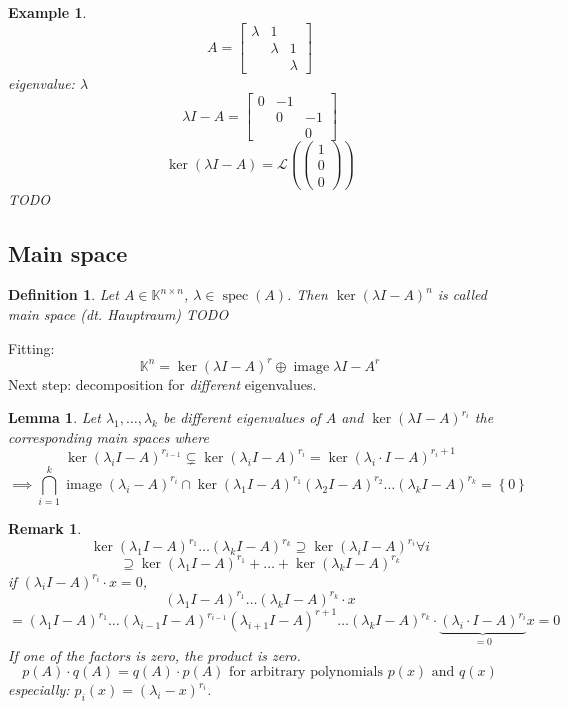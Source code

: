 \documentclass{article}
\newtheorem{example}{Example}  \numberwithin{example}{section}
\newtheorem{definition}{Definition}  \numberwithin{definition}{section}
\newtheorem{lemma}{Lemma}  \numberwithin{lemma}{section}
\newtheorem{remark}{Remark}  \numberwithin{remark}{section}
\newcommand{\set}[1]{\left\{#1\right\}}
\newcommand{\vecthree}[3]{\begin{pmatrix} #1 \\ #2 \\ #3 \end{pmatrix}}
\DeclareMathOperator{\im}{image}
\begin{document}
\begin{example}
  \[A = \begin{bmatrix} \lambda & 1 &  \\ & \lambda & 1 \\ & & \lambda \end{bmatrix} \]
  eigenvalue: $\lambda$
  \[ \lambda I - A = \begin{bmatrix} 0 & -1 & \\ & 0 & -1 \\ & & 0 \end{bmatrix} \]
  \[ \ker(\lambda I - A) = \mathcal L\left(\vecthree 100\right) \]
  TODO
\end{example}

\subsection{Main space}

\begin{definition} %
  Let $A \in \mathbb K^{n\times n}$, $\lambda \in \operatorname{spec}(A)$.
  Then $\ker(\lambda I - A)^n$ is called \emph{main space} (dt. \foreignlanguage{german}{Hauptraum})
  TODO
\end{definition}

Fitting:
\[ \mathbb K^n = \ker(\lambda I - A)^r \oplus \im{\lambda I - A}^r \]
Next step: decomposition for \emph{different} eigenvalues.

\begin{lemma} %
  \label{lemma1111}
  Let $\lambda_1, \dots, \lambda_k$ be different eigenvalues of $A$ and
  $\ker(\lambda I - A)^{r_i}$ the corresponding main spaces where
  \[ \ker(\lambda_i I - A)^{r_{i-1}} \subsetneq \ker(\lambda_i I - A)^{r_i} = \ker(\lambda_i \cdot I - A)^{r_i + 1} \]
  \[ \implies \bigcap_{i=1}^k \im(\lambda_i - A)^{r_i} \cap \ker(\lambda_1 I - A)^{r_1} (\lambda_2 I - A)^{r_2} \dots (\lambda_k I - A)^{r_k} = \set{0} \]
\end{lemma}

\begin{remark}
  \[ \ker(\lambda_1 I - A)^{r_1} \dots (\lambda_k I - A)^{r_k} \supseteq \ker(\lambda_i I - A)^{r_i} \forall i \]
  \[ \supseteq \ker(\lambda_1 I - A)^{r_1} + \dots + \ker(\lambda_k I - A)^{r_k} \]
  if $(\lambda_i I - A)^{r_i} \cdot x = 0$,
  \[ (\lambda_1 I - A)^{r_1} \dots (\lambda_k I - A)^{r_k} \cdot x \]
  \[ = (\lambda_1 I - A)^{r_1} \dots (\lambda_{i-1} I - A)^{r_{i-1}} (\lambda_{i+1} I - A)^{r+1} \dots (\lambda_k I - A)^{r_k} \cdot \underbrace{(\lambda_i \cdot I - A)^{r_i}}_{=0} x = 0 \]
  If one of the factors is zero, the product is zero.
  \[ p(A) \cdot q(A) = q(A) \cdot p(A) \text{ for arbitrary polynomials } p(x) \text{ and } q(x) \]
  especially: $p_i(x) = (\lambda_i - x)^{r_i}$.
\end{remark}
\end{document}
